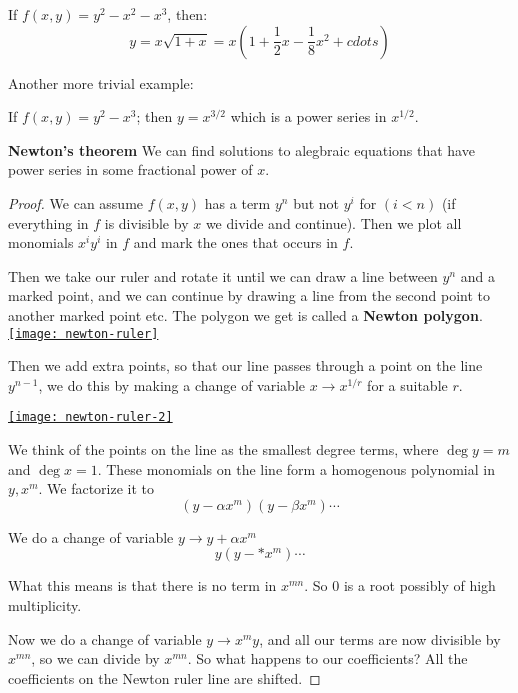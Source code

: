 \begin{example}
    If $f(x,y) = y^2-x^2-x^3$, then:\begin{equation*}
        y=x\sqrt{1+x} = x(1+\frac{1}{2}x-\frac{1}{8}x^2+cdots)
    \end{equation*}

    Another more trivial example:

    If $f(x,y) = y^2-x^3$; then $y=x^{3/2}$ which is a power series in $x^{1/2}$.
\end{example}

\begin{theorem}\textbf{Newton's theorem}
    We can find solutions to alegbraic equations that have power series in some fractional power of $x$.

    \begin{proof}
        
    
We can assume $f(x,y)$ has a term $y^n$ but not $y^i$ for $(i<n)$ (if everything in $f$ is divisible by $x$ we divide and continue). Then we plot all monomials $x^i y^i$ in $f$ and mark the ones that occurs in $f$.

Then we take our ruler and rotate it until we can draw a line between $y^n$ and a marked point, and we can continue by drawing a line from the second point to another marked point etc. The polygon we get is called a \textbf{Newton polygon}.
\href{https://youtu.be/paenRVq0vnc?t=396}{\texttt{[image: newton-ruler]}}

Then we add extra points, so that our line passes through a point on the line $y^{n-1}$, we do this by making a change of variable $x\rightarrow x^{1/r}$ for a suitable $r$.

\href{https://youtu.be/paenRVq0vnc?t=530}{\texttt{[image: newton-ruler-2]}}


We think of the points on the line as the smallest degree terms, where $\deg y = m$ and $\deg x = 1$. These monomials on the line form a homogenous polynomial in $y,x^m$. We factorize it to 
\[
    (y-\alpha x^m)(y-\beta x^m)\cdots    
\]

We do a change of variable $y\rightarrow y+\alpha x^m$
\[
    y(y-\ast x^m)\cdots    
\]

What this means is that there is no term in $x^{mn}$. So $0$ is a root possibly of high multiplicity.

Now we do a change of variable $y\rightarrow x^m y$, and all our terms are now divisible by $x^{mn}$, so we can divide by $x^{mn}$. So what happens to our coefficients? All the coefficients on the Newton ruler line are shifted. 


\end{proof}
\end{theorem}
